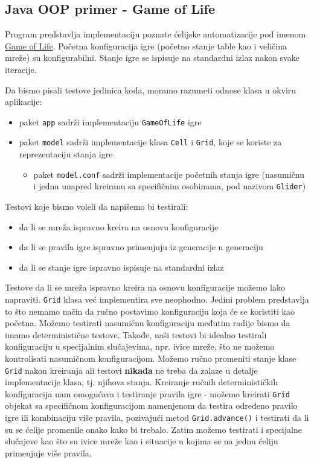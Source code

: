 \subsection{Java OOP primer - Game of Life}\label{java-oop-primer---game-of-life}

Program predstavlja implementaciju poznate ćelijske automatizacije pod imenom \href{https://en.wikipedia.org/wiki/Conway\%27s_Game_of_Life}{Game of Life}. Početna konfiguracija igre (početno stanje table kao i veličina mreže) su konfigurabilni. Stanje igre se ispisuje na standardni izlaz nakon svake iteracije.

Da bismo pisali testove jedinica koda, moramo razumeti odnose klasa u okviru aplikacije:

\begin{itemize}
\tightlist
\item
  paket \texttt{app} sadrži implementaciju \texttt{GameOfLife} igre
\item
  paket \texttt{model} sadrži implementacije klasa \texttt{Cell} i \texttt{Grid}, koje se koriste za reprezentaciju stanja igre

  \begin{itemize}
  \tightlist
  \item
    paket \texttt{model.conf} sadrži implementacije početnih stanja igre (nasumičnu i jednu unapred kreiranu sa specifičnim osobinama, pod nazivom \texttt{Glider})
  \end{itemize}
\end{itemize}

Testovi koje bismo voleli da napišemo bi testirali:

\begin{itemize}
\tightlist
\item
  da li se mreža ispravno kreira na osnovu konfiguracije
\item
  da li se pravila igre ispravno primenjuju iz generacije u generaciju
\item
  da li se stanje igre ispravno ispisuje na standardni izlaz
\end{itemize}

Testove da li se mreža ispravno kreira na osnovu konfiguracije možemo lako napraviti. \texttt{Grid} klasa već implementira sve neophodno. Jedini problem predstavlja to što nemamo način da ručno postavimo konfiguraciju koja će se koristiti kao početna. Možemo testirati nasumičnu konfiguraciju međutim radije bismo da imamo deterministične testove. Takođe, naši testovi bi idealno testirali konfiguraciju u specijalnim slučajevima, npr. ivice mreže, što ne možemo kontrolisati nasumičnom konfiguracijom. Možemo ručno promeniti stanje klase \texttt{Grid} nakon kreiranja ali testovi \textbf{nikada} ne treba da zalaze u detalje implementacije klasa, tj. njihova stanja. Kreiranje ručnih determinističkih konfiguracija nam omogućava i testiranje pravila igre - možemo kreirati \texttt{Grid} objekat sa specifičnom konfiguracijom namenjenom da testira određeno pravilo igre ili kombinaciju više pravila, pozivajući metod \texttt{Grid.advance()} i testirati da li su se ćelije promenile onako kako bi trebalo. Zatim možemo testirati i specijalne slučajeve kao što su ivice mreže kao i situacije u kojima se na jednu ćeliju primenjuje više pravila.

